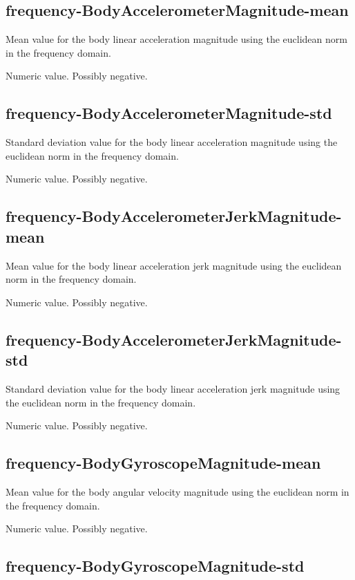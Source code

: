 \documentclass[a4paper,10pt]{report}
\begin{document}
\subsection*{frequency-BodyAccelerometerMagnitude-mean} 

Mean value for the body linear acceleration magnitude using the euclidean norm in the frequency domain.

Numeric value. Possibly negative.

\subsection*{frequency-BodyAccelerometerMagnitude-std} 

Standard deviation value for the body linear acceleration magnitude using the euclidean norm in the frequency domain.

Numeric value. Possibly negative.

\subsection*{frequency-BodyAccelerometerJerkMagnitude-mean} 

Mean value for the body linear acceleration jerk magnitude using the euclidean norm in the frequency domain.

Numeric value. Possibly negative.

\subsection*{frequency-BodyAccelerometerJerkMagnitude-std} 

Standard deviation value for the body linear acceleration jerk magnitude using the euclidean norm in the frequency domain.

Numeric value. Possibly negative.

\subsection*{frequency-BodyGyroscopeMagnitude-mean} 

Mean value for the body angular velocity magnitude using the euclidean norm in the frequency domain.

Numeric value. Possibly negative.

\subsection*{frequency-BodyGyroscopeMagnitude-std} 
\end{document}
